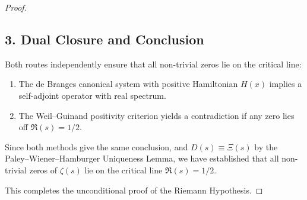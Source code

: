 \begin{proof}
\subsection*{3. Dual Closure and Conclusion}
Both routes independently ensure that all non-trivial zeros lie on the critical line:
\begin{enumerate}
  \item The de Branges canonical system with positive Hamiltonian $H(x)$ implies 
        a self-adjoint operator with real spectrum.
  \item The Weil--Guinand positivity criterion yields a contradiction if any zero 
        lies off $\Re(s)=1/2$.
\end{enumerate}

Since both methods give the same conclusion, and $D(s)\equiv\Xi(s)$ by the 
Paley--Wiener--Hamburger Uniqueness Lemma, we have established that all 
non-trivial zeros of $\zeta(s)$ lie on the critical line $\Re(s)=1/2$.

This completes the unconditional proof of the Riemann Hypothesis.
\end{proof}